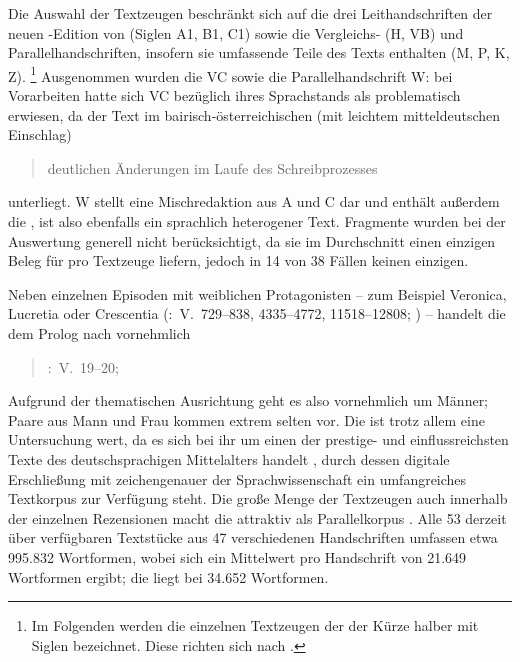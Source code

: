 Die Auswahl der Textzeugen beschränkt sich auf die drei
Leithandschriften der neuen \KC{}-Edition von
\citeauthor{chincaetal2019b} (Siglen A1, B1, C1) sowie die Vergleichs- (H, VB)
und Parallelhandschriften, insofern sie umfassende Teile des
Texts enthalten (M, P, K, Z).%
%
	\footnote{Im Folgenden werden die einzelnen Textzeugen der \KC{} der
	Kürze halber mit Siglen bezeichnet. Diese richten sich nach
	 \autocite{kcdigital}.}
%
Ausgenommen wurden die  VC sowie die
Parallelhandschrift W: bei Vorarbeiten hatte sich VC bezüglich ihres
Sprachstands als problematisch erwiesen, da der Text im
bairisch-österreichischen  (mit leichtem
mitteldeutschen Einschlag)
\blockcquote[73]{wolf:kckat}{deutlichen Änderungen im Laufe des
Schreibprozesses} unterliegt. W stellt eine Mischredaktion aus A und C dar und
enthält außerdem die 
\autocite[48--54]{weis2022}, ist also ebenfalls ein sprachlich heterogener
Text. Fragmente wurden bei der Auswertung generell nicht berücksichtigt, da sie
im Durchschnitt einen einzigen Beleg für  pro Textzeuge liefern,
jedoch in 14 von 38 Fällen keinen einzigen.

Neben einzelnen Episoden mit weiblichen Protagonisten -- zum Beispiel Veronica,
Lucretia oder Crescentia (\KC:~V.~729--838, 4335--4772, 11518--12808;
\cite[vgl.][94--96, 161--169, 292--314]{schroeder1895}) -- handelt die \KC{} dem
Prolog nach vornehmlich

\blockquote[{\KC:~V.~19--20; \cite[79]{schroeder1895}}]{

}

Aufgrund der thematischen Ausrichtung geht es also vornehmlich um Männer; Paare
aus Mann und Frau kommen extrem selten vor. Die \KC{} ist trotz allem eine
Untersuchung wert, da es sich bei ihr um einen der prestige- und
einflussreichsten Texte des deutschsprachigen Mittelalters handelt
\autocite[93]{wolf2008}, durch dessen digitale Erschließung mit zeichengenauer
 \autocite{kcdigital} der Sprachwissenschaft ein
umfangreiches Textkorpus zur Verfügung steht. Die große Menge der
Textzeugen auch innerhalb der einzelnen Rezensionen macht die \KC{} attraktiv
als Parallelkorpus \autocite{cysouwwaelchli2007}. Alle 53
derzeit über  verfügbaren Textstücke aus 47 verschiedenen
Handschriften umfassen etwa 995.832 Wortformen, wobei sich ein Mittelwert pro
Handschrift von 21.649 Wortformen ergibt; die  liegt
bei 34.652 Wortformen.

